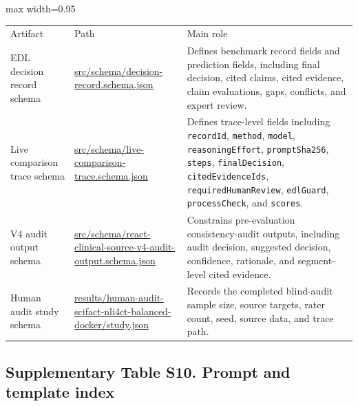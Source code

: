 \documentclass[
  8pt,
]{extarticle}
\begin{document}
\begin{center}
\begin{adjustbox}{max width=0.95\textwidth}
\begin{tabular}{@{}
lll@{}}
\toprule\noalign{}
Artifact & Path & Main role \\

EDL decision record schema &
\url{src/schema/decision-record.schema.json} & Defines benchmark
record fields and prediction fields, including final decision, cited
claims, cited evidence, claim evaluations, gaps, conflicts, and expert
review. \\
Live comparison trace schema &
\url{src/schema/live-comparison-trace.schema.json} & Defines
trace-level fields including \texttt{recordId}, \texttt{method},
\texttt{model}, \texttt{reasoningEffort}, \texttt{promptSha256},
\texttt{steps}, \texttt{finalDecision}, \texttt{citedEvidenceIds},
\texttt{requiredHumanReview}, \texttt{edlGuard}, \texttt{processCheck},
and \texttt{scores}. \\
V4 audit output schema &
\url{src/schema/react-clinical-source-v4-audit-output.schema.json} &
Constrains pre-evaluation consistency-audit outputs, including audit
decision, suggested decision, confidence, rationale, and segment-level
cited evidence. \\
Human audit study schema &
\url{results/human-audit-scifact-nli4ct-balanced-docker/study.json} &
Records the completed blind-audit sample size, source targets, rater
count, seed, source data, and trace path. \\
\bottomrule
\end{tabular}
\end{adjustbox}
\end{center}

\hypertarget{supplementary-table-s10-prompt-and-template-index}{%
\subsection{Supplementary Table S10. Prompt and template
index}\label{supplementary-table-s10-prompt-and-template-index}}
\end{document}
